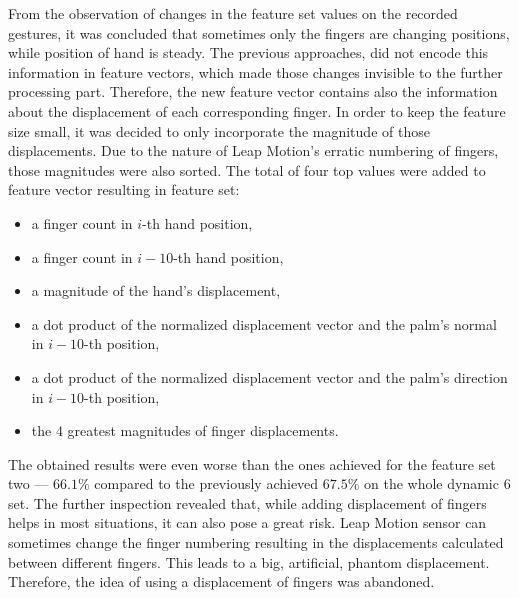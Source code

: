 From the observation of changes in the feature set values on the recorded gestures, it was concluded that sometimes only the fingers are changing positions, while position of hand is steady.
The previous approaches, did not encode this information in feature vectors, which made those changes invisible to the further processing part.
Therefore, the new feature vector contains also the information about the displacement of each corresponding finger.
In order to keep the feature size small, it was decided to only incorporate the magnitude of those displacements. 
Due to the nature of Leap Motion's erratic numbering of fingers, those magnitudes were also sorted.
The total of four top values were added to feature vector resulting in feature set:
\begin{itemize}
\item a finger count in $i$-th hand position,
\item a finger count in $i-10$-th hand position,
\item a magnitude of the hand's displacement,
\item a dot product of the normalized displacement vector and the palm's normal in $i-10$-th position,
\item a dot product of the normalized displacement vector and the palm's direction in $i-10$-th position,
\item the $4$ greatest magnitudes of finger displacements.
\end{itemize}
The obtained results were even worse than the ones achieved for the feature set two --- $66.1\%$ compared to the previously achieved $67.5\%$ on the whole dynamic 6 set. 
The further inspection revealed that, while adding displacement of fingers helps in most situations, it can also pose a great risk.
Leap Motion sensor can sometimes change the finger numbering resulting in the displacements calculated between different fingers.
This leads to a big, artificial, phantom displacement.
Therefore, the idea of using a displacement of fingers was abandoned.
 
